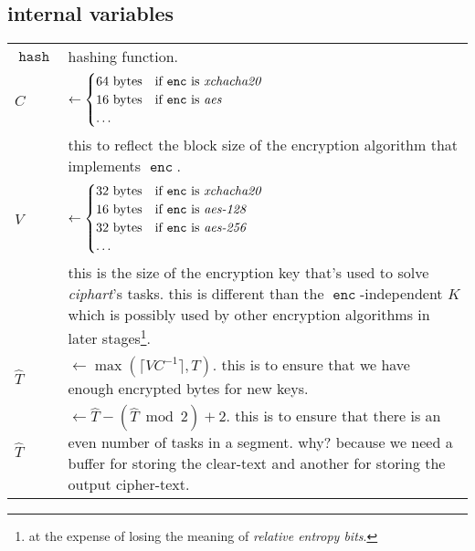 \documentclass[twocolumn]{article}
\DeclareMathOperator{\enc}{\mathtt{enc}}
\DeclareMathOperator{\maxf}{max}
\DeclareMathOperator{\hash}{\mathtt{hash}}
\begin{document}
\subsection{internal variables}
\begin{tabularx}{\columnwidth}{lX}
    $\hash$ & hashing function.\\
    $C$         & $\gets \begin{cases}
                        64 \text{ bytes} & \text{if $\enc$ is
                                            \emph{xchacha20}}\\
                        16 \text{ bytes} & \text{if $\enc$ is \emph{aes}}\\
                        \ldots & \\
                     \end{cases}$\\
                & this to reflect the block size of the encryption
                    algorithm that implements $\enc$.\\
    $V$ & $\gets \begin{cases}
                        32 \text{ bytes} & \text{if $\enc$ is
                                            \emph{xchacha20}}\\
                        16 \text{ bytes} & \text{if $\enc$ is
                            \emph{aes-128}}\\
                        32 \text{ bytes} & \text{if $\enc$ is
                            \emph{aes-256}}\\
                        \ldots & \\
                     \end{cases}$\\
                & this is the size of the encryption key that's used to
                    solve \emph{ciphart}'s tasks.  this is different than
                    the $\enc$-independent $K$ which is
                    possibly used by other encryption algorithms in later
                    stages\footnote{at the expense of losing the meaning of
                    \emph{relative entropy bits}.}.\\
    $\hat T$    & $\gets \maxf(\lceil V C^{-1}\rceil, T)$.  this
                    is to ensure that we have enough encrypted bytes for
                    new keys.\\
    $\hat T$    & $\gets \hat T - (\hat T \bmod 2) + 2$.  this is to ensure
                    that there is an even number of tasks in a segment.
                    why?  because we need a buffer for storing the
                    clear-text and another for storing the output
                    cipher-text.\\
\end{tabularx}
\end{document}
